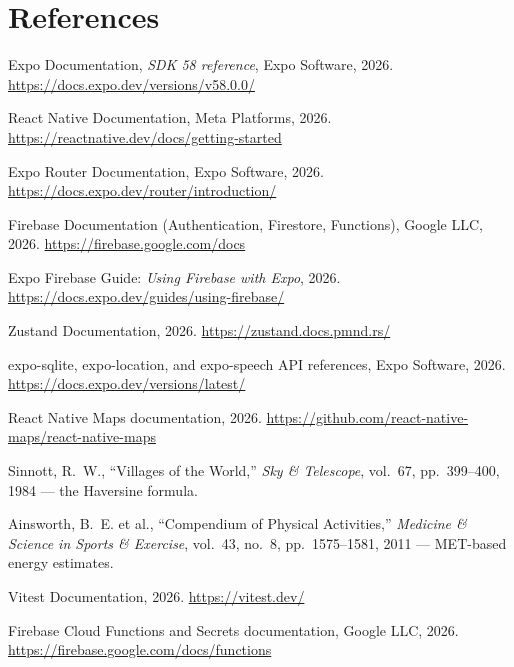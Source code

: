 \documentclass[12pt, a4paper]{report}
\begin{document}
\chapter{References}

\begin{enumerate}[label={[\arabic*]}, leftmargin=1.1cm, itemsep=5pt]
  \item Expo Documentation, \emph{SDK 58 reference}, Expo Software, 2026.
        \url{https://docs.expo.dev/versions/v58.0.0/}
  \item React Native Documentation, Meta Platforms, 2026.
        \url{https://reactnative.dev/docs/getting-started}
  \item Expo Router Documentation, Expo Software, 2026.
        \url{https://docs.expo.dev/router/introduction/}
  \item Firebase Documentation (Authentication, Firestore, Functions),
        Google LLC, 2026. \url{https://firebase.google.com/docs}
  \item Expo Firebase Guide: \emph{Using Firebase with Expo}, 2026.
        \url{https://docs.expo.dev/guides/using-firebase/}
  \item Zustand Documentation, 2026. \url{https://zustand.docs.pmnd.rs/}
  \item expo-sqlite, expo-location, and expo-speech API references, Expo
        Software, 2026. \url{https://docs.expo.dev/versions/latest/}
  \item React Native Maps documentation, 2026.
        \url{https://github.com/react-native-maps/react-native-maps}
  \item Sinnott, R.~W., ``Villages of the World,'' \emph{Sky \& Telescope},
        vol.~67, pp.~399--400, 1984 --- the Haversine formula.
  \item Ainsworth, B.~E. et al., ``Compendium of Physical Activities,''
        \emph{Medicine \& Science in Sports \& Exercise}, vol.~43, no.~8,
        pp.~1575--1581, 2011 --- MET-based energy estimates.
  \item Vitest Documentation, 2026. \url{https://vitest.dev/}
  \item Firebase Cloud Functions and Secrets documentation, Google LLC, 2026.
        \url{https://firebase.google.com/docs/functions}
\end{enumerate}
\end{document}
